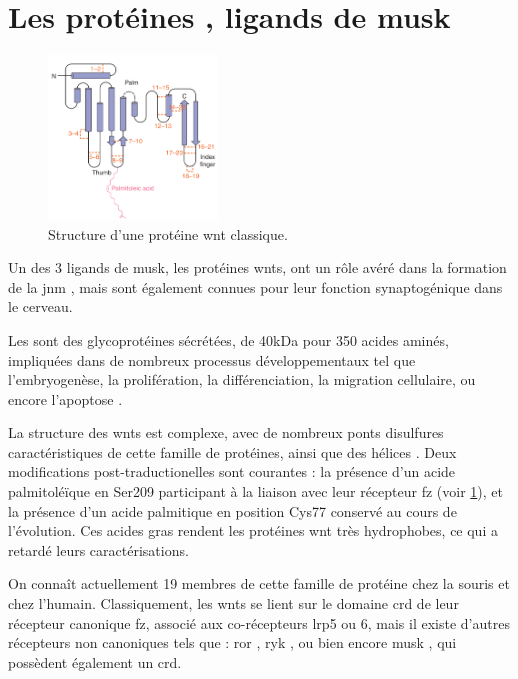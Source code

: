 \section{Les protéines , ligands de \acrshort{musk}}
\label{sec:IntroWnt}	
	\begin{figure}
		\includegraphics[width=0.4\textwidth]{./Images/WntProtein.png}	
		\caption{Structure d'une protéine \Gls{wnt} classique.}
		\label{fig:WntProt}
	\end{figure}
	
	Un des 3 ligands de \gls{musk}, les protéines \glspl{wnt}, ont un rôle avéré dans la formation de la \gls{jnm} \cite{Hall2000}, mais sont également connues pour leur fonction synaptogénique dans le cerveau.
	
	Les  sont des glycoprotéines sécrétées, de 40kDa pour 350 acides aminés, impliquées dans de nombreux processus développementaux tel que l'embryogenèse, la prolifération, la différenciation, la migration cellulaire, ou encore l'apoptose \cite{Miller2002, Willert2012}. 
	
	La structure des \Glspl{wnt} est complexe, avec  de nombreux ponts disulfures caractéristiques de cette famille de protéines, ainsi que des hélices \textalpha{}. Deux modifications post-traductionelles sont courantes : la présence d'un acide palmitoléïque en Ser209 participant à la liaison avec leur récepteur \gls{fz} (voir \cref{fig:WntProt}), et la présence d'un acide palmitique en position Cys77 conservé au cours de l'évolution\cite{Takada2006}. Ces acides gras rendent les protéines \Gls{wnt} très hydrophobes, ce qui a retardé leurs caractérisations.
	
	On connaît actuellement 19 membres de cette famille de protéine chez la souris et chez l'humain. Classiquement, les \Glspl{wnt} se lient sur le domaine \gls{crd} de leur récepteur canonique \gls{fz}, associé aux co-récepteurs \gls{lrp}5 ou 6, mais il existe d'autres récepteurs non canoniques tels que : \gls{ror} \cite{Cadigan2006, Gordon2006, Green2008}, \gls{ryk} \cite{Bovolenta2006, Fradkin2010}, ou bien encore \gls{musk} \cite{Jing2009}, qui possèdent également un \gls{crd}.
	
